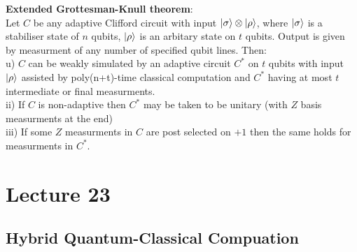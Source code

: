 \documentclass{article}
\begin{document}
\textbf{Extended Grottesman-Knull theorem}:\\
Let $C$ be any adaptive Clifford circuit with input $\ket{\sigma} \otimes \ket{\rho}$, where $\ket{\sigma}$ is a stabiliser state of $n$ qubits, $\ket{\rho}$ is an arbitary state on $t$ qubits. Output is given by measurment of any number of specified qubit lines. Then:\\
u) $C$ can be weakly simulated by an adaptive circuit $C^*$ on $t$ qubits with input $\ket{\rho}$ assisted by poly(n+t)-time classical computation and $C^*$ having at most $t$ intermediate or final measurments. \\
ii)  If $C$ is non-adaptive then $C^*$ may be taken to be unitary (with $Z$ basis measurments at the end)\\
iii) If some $Z$ measurments in $C$ are post selected on $+1$ then the same holds for measurments in $C^*$.
\section{Lecture 23}
\subsection{Hybrid Quantum-Classical Compuation}
\end{document}
